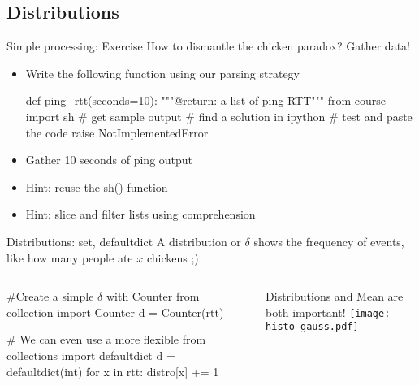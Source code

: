 \subsection{Distributions}
\begin{pyframe}{Simple processing: Exercise}
How to dismantle the chicken paradox? Gather data!
\begin{itemize}
\item Write the following function using our parsing strategy
\begin{pycode}
def ping_rtt(seconds=10):
    """@return: a list of ping RTT"""
    from course import sh
    # get sample output
    # find a solution in ipython
    # test and paste the code
    raise NotImplementedError
\end{pycode}
\item Gather 10 seconds of ping output
\item Hint: reuse the sh() function
\item Hint: slice and filter lists using comprehension
\end{itemize}
\end{pyframe}

\iffalse %
def ping_rtt():
    """
       goal: slicing data
       goal: using zip to transpose data
    """
    cmd = "ping -c10 www.google.it"
    if 'win' in sys.platform:
        cmd = "ping -n10 www.google.it"

    ping_output = sh(cmd)
    if 'win' in sys.platform:
        ping_output = [ping_output[6::2] for x in ping_output]
    else:
        ping_output = [ping_output[-4:-1:2] for x in ping_output]
    ttl, rtt = zip(*ping_output)
    return map(float, rtt)
\fi


\begin{pyframe}{Distributions: set, defaultdict}
A distribution or $\delta$ shows the frequency of events, like 
how many people ate $x$ chickens ;)
\begin{columns}
\begin{pycode}
#Create a simple $\delta$ with Counter
from collection import Counter
d = Counter(rtt)

# We can even use a more flexible
from collections import defaultdict
d = defaultdict(int)
for x in rtt:
    distro[x] += 1
    


\end{pycode}
\footnotesize
Distributions and Mean are both important!
\texttt{[image: histo\_gauss.pdf]}
\end{columns}
\end{pyframe}

